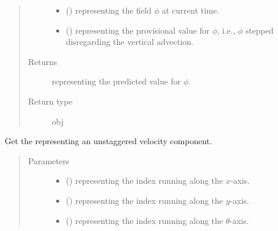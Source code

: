 \documentclass[letterpaper,10pt,english]{sphinxmanual}
\begin{document}
\begin{fulllineitems}
\begin{fulllineitems}
\begin{quote}
\begin{description}
\begin{itemize}
\item {} 
 () \textendash{}  representing the field \(\phi\) at current time.

\item {} 
 () \textendash{}  representing the provisional value for \(\phi\), i.e., \(\phi\) stepped
disregarding the vertical advection.

\end{itemize}

\item[{Returns}] \leavevmode
{} representing the predicted value for \(\phi\).

\item[{Return type}] \leavevmode
obj

\end{description}\end{quote}

\end{fulllineitems}


\begin{fulllineitems}
\label{\detokenize{api:tasmania.dycore.flux_isentropic_maccormack.FluxIsentropicMacCormack._get_velocity}}
Get the  representing an unstaggered velocity component.
\begin{quote}\begin{description}
\item[{Parameters}] \leavevmode\begin{itemize}
\item {} 
 () \textendash{}  representing the index running along the \(x\)-axis.

\item {} 
 () \textendash{}  representing the index running along the \(y\)-axis.

\item {} 
 () \textendash{}  representing the index running along the \(\theta\)-axis.


\end{itemize}
\end{description}
\end{quote}
\end{fulllineitems}
\end{fulllineitems}
\end{document}
